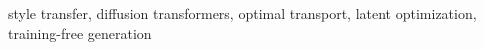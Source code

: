 \documentclass[10pt,journal,compsoc]{IEEEtran}
\begin{document}
\begin{IEEEkeywords}
style transfer, diffusion transformers, optimal transport, latent optimization,
training-free generation
\end{IEEEkeywords}









\clearpage   %
\balance




\end{document}

